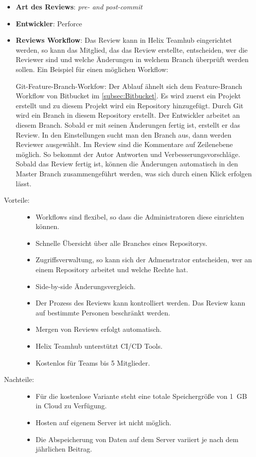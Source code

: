 \begin{itemize}
	\item \textbf{Art des Reviews}: \textit{pre- and post-commit}
	\item \textbf{Entwickler}: Perforce
	\item \textbf{Reviews Workflow}: Das Review kann in Helix Teamhub eingerichtet werden, so kann das Mitglied, das das Review erstellte, entscheiden, wer die Reviewer
		 sind und welche Änderungen in welchem Branch überprüft werden sollen.
		 Ein Beispiel für einen möglichen Workflow:
		 
		  Git-Feature-Branch-Workfow: Der Ablauf ähnelt sich dem Feature-Branch Workflow von Bitbucket im \cref{subsec:Bitbucket}.
		  Es wird zuerst ein Projekt erstellt und zu diesem Projekt wird ein Repository hinzugefügt. Durch Git wird ein Branch in diesem Repository
		  erstellt. Der Entwickler arbeitet an diesem Branch. Sobald er mit seinen Änderungen fertig ist, erstellt er das Review. In den Einstellungen sucht man den Branch aus, dann werden Reviewer
		  ausgewählt. Im Review sind die Kommentare auf Zeilenebene möglich. So bekommt der Autor Antworten und Verbesserungsvorschläge. Sobald das Review fertig ist,
		  können die Änderungen automatisch in den Master Branch zusammengeführt werden, was sich durch einen Klick erfolgen lässt.

\end{itemize}

\begin{description}
	\item [Vorteile:] \hfill
	\begin{itemize}
		\item Workflows sind flexibel, so dass die Administratoren diese einrichten können.
		\item Schnelle Übersicht über alle Branches eines Repositorys.
		\item Zugriffsverwaltung, so kann sich der Admenstrator entscheiden, wer an einem Repository arbeitet und welche Rechte hat.
		\item Side-by-side Änderungsvergleich.
		\item Der Prozess des Reviews kann kontrolliert werden. Das Review kann auf bestimmte Personen beschränkt werden.
		\item Mergen von Reviews erfolgt automatisch.
		\item Helix Teamhub unterstützt \ac{CI}/\ac{CD} Tools.
		\item Kostenlos für Teams bis 5 Mitglieder.
	\end{itemize}
	
	\item [Nachteile:] \hfill
	\begin{itemize}
	\item Für die kostenlose Variante steht eine totale Speichergröße von 1~GB in Cloud zu Verfügung.
	\item Hosten auf eigenem Server ist nicht möglich.
	\item Die Abspeicherung von Daten auf dem Server variiert je nach dem jährlichen Beitrag.
	\end{itemize}
\end{description}


